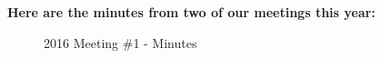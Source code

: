 \pagebreak
\textbf{Here are the minutes from two of our meetings this year:}
\begin{figure}[H] 
	\caption{2016 Meeting \#1 - Minutes}
	\label{fig:speciation}
\end{figure}
